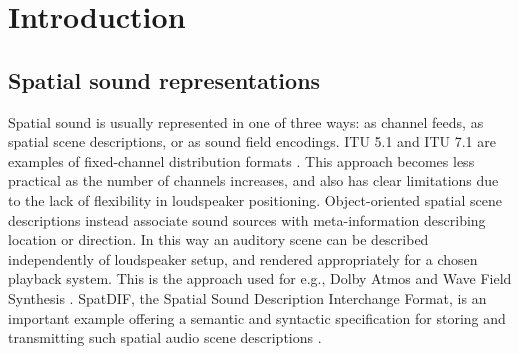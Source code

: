 \documentclass{article}
\title{\papertitle}
\begin{document}
%
\capstartfalse
\maketitle
\capstarttrue




\begin{abstract}
The abstract should be placed at the top left column and should contain about 150–-200 words.
\end{abstract}




\section{Introduction}\label{sec:introduction}

\subsection{Spatial sound representations}\label{sec:spatial-sound}

Spatial sound is usually represented in one of three ways: as channel feeds, as spatial scene descriptions, or as sound field encodings.
ITU 5.1 and ITU 7.1 are examples of fixed-channel distribution formats \cite{ITU:1993_surround_5:1}.
This approach becomes less practical as the number of channels increases, and also has clear limitations due to the lack of flexibility in loudspeaker positioning.
Object-oriented spatial scene descriptions instead associate sound sources with meta-information describing location or direction. In this way an auditory scene can be described independently of loudspeaker setup, and rendered appropriately for a chosen playback system.
This is the approach used for e.g., Dolby Atmos and Wave Field Synthesis \cite{dolby:2014atmos}.
SpatDIF, the Spatial Sound Description Interchange Format, is an important example offering a semantic and syntactic specification for storing and transmitting such spatial audio scene descriptions \cite{Peters:2013spatdif}.
\end{document}
